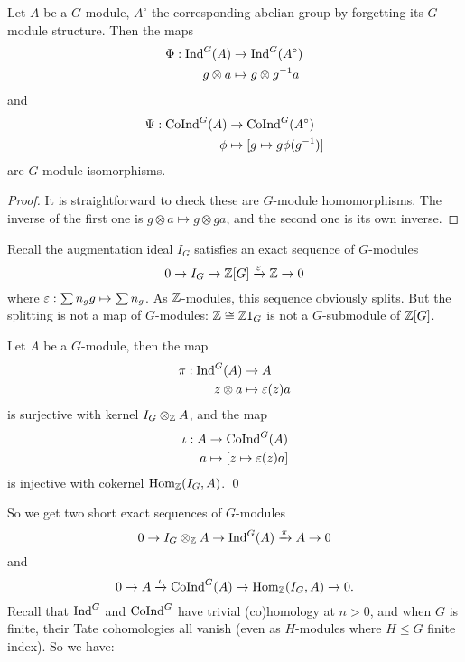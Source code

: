 \documentclass[11pt]{amsart}
\begin{document}
\begin{lem}
    Let $A$ be a $G$-module, $A^\circ$ the corresponding abelian group by forgetting its $G$-module structure. Then the maps
    \begin{align*}
        \Phi: \operatorname{Ind}^G(A) &\to \operatorname{Ind}^G(A^\circ) \\
        g\otimes a &\mapsto g\otimes g^{-1}a
    \end{align*}
    and
    \begin{align*}
        \Psi: \operatorname{CoInd}^G(A) &\to \operatorname{CoInd}^G(A^\circ) \\
        \phi &\mapsto [g\mapsto g\phi(g^{-1})]
    \end{align*}
    are $G$-module isomorphisms.
\end{lem}

\begin{proof}
    It is straightforward to check these are $G$-module homomorphisms. The inverse of the first one is $g\otimes a \mapsto g\otimes ga$, and the second one is its own inverse.
\end{proof}


Recall the augmentation ideal $I_G$ satisfies an exact sequence of $G$-modules
\[0\to I_G\to \mathbb{Z}[G]\xrightarrow{\varepsilon} \mathbb{Z}\to 0\]
where $\varepsilon: \sum n_g g \mapsto \sum n_g$. As $\mathbb{Z}$-modules, this sequence obviously splits. But the splitting is not a map of $G$-modules: $\mathbb{Z}\cong \mathbb{Z} 1_G$ is not a $G$-submodule of $\mathbb{Z}[G]$.

\begin{lem}
    Let $A$ be a $G$-module, then the map 
    \begin{align*}
        \pi: \operatorname{Ind}^G(A)&\to A \\
        z\otimes a &\mapsto \varepsilon(z)a
    \end{align*}
    is surjective with kernel $I_G\otimes_{\mathbb{Z}} A$, and the map
    \begin{align*}
        \iota: A&\to \operatorname{CoInd}^G(A) \\
        a &\mapsto [z\mapsto \varepsilon(z)a]
    \end{align*}
    is injective with cokernel $\operatorname{Hom}_{\mathbb{Z}}(I_G,A)$. \qed
\end{lem}

So we get two short exact sequences of $G$-modules
\[0\to I_G\otimes_{\mathbb{Z}} A \to \operatorname{Ind}^G(A) \xrightarrow{\pi} A\to 0\]
and
\[0\to A \xrightarrow{\iota} \operatorname{CoInd}^G(A) \to \operatorname{Hom}_{\mathbb{Z}}(I_G, A) \to 0.\]
Recall that $\operatorname{Ind}^G$ and $\operatorname{CoInd}^G$ have trivial (co)homology at $n>0$, and when $G$ is finite, their Tate cohomologies all vanish (even as $H$-modules where $H\le G$ finite index). So we have:
\end{document}
